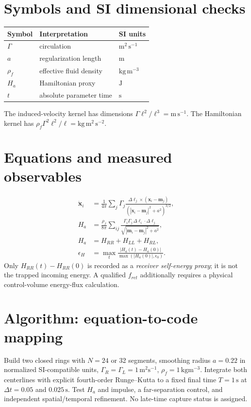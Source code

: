 \documentclass[11pt,a4paper]{article}
\newcommand{\rhoF}{\rho_{\!f}}
\begin{document}
\section{Symbols and SI dimensional checks}
\begin{center}\begin{tabular}{lll}\toprule
Symbol & Interpretation & SI units\\\midrule
$\Gamma$ & circulation & $\mathrm{m^2\,s^{-1}}$\\
$a$ & regularization length & $\mathrm m$\\
$\rhoF$ & effective fluid density & $\mathrm{kg\,m^{-3}}$\\
$H_a$ & Hamiltonian proxy & $\mathrm J$\\
$t$ & absolute parameter time & $\mathrm s$\\\bottomrule\end{tabular}\end{center}
The induced-velocity kernel has dimensions $\Gamma\ell^2/\ell^3=\mathrm{m\,s^{-1}}$. The Hamiltonian kernel has $\rhoF\Gamma^2\ell^2/\ell=\mathrm{kg\,m^2\,s^{-2}}$.
\section{Equations and measured observables}
\begin{align}
\dot{\mathbf x}_i&=\frac{1}{4\pi}\sum_j\Gamma_j\frac{\Delta\boldsymbol\ell_j\times(\mathbf x_i-\mathbf m_j)}{(|\mathbf x_i-\mathbf m_j|^2+a^2)^{3/2}},\\
H_a&=\frac{\rhoF}{8\pi}\sum_{ij}\frac{\Gamma_i\Gamma_j\,\Delta\boldsymbol\ell_i\cdot\Delta\boldsymbol\ell_j}{\sqrt{|\mathbf m_i-\mathbf m_j|^2+a^2}},\\
H_a&=H_{RR}+H_{LL}+H_{RL},\\
\epsilon_H&=\max_t\frac{|H_a(t)-H_a(0)|}{\max(|H_a(0)|,\epsilon_0)}.
\end{align}
Only $H_{RR}(t)-H_{RR}(0)$ is recorded as a \emph{receiver self-energy proxy}; it is not the trapped incoming energy. A qualified $f_{ret}$ additionally requires a physical control-volume energy-flux calculation.
\section{Algorithm: equation-to-code mapping}
Build two closed rings with $N=24$ or 32 segments, smoothing radius $a=0.22$ in normalized SI-compatible units, $\Gamma_R=\Gamma_L=1\,\mathrm{m^2s^{-1}}$, $\rhoF=1\,\mathrm{kgm^{-3}}$. Integrate both centerlines with explicit fourth-order Runge--Kutta to a fixed final time $T=1\,\mathrm s$ at $\Delta t=0.05$ and $0.025\,\mathrm s$. Test $H_a$ and impulse, a far-separation control, and independent spatial/temporal refinement. No late-time capture status is assigned.
\end{document}
